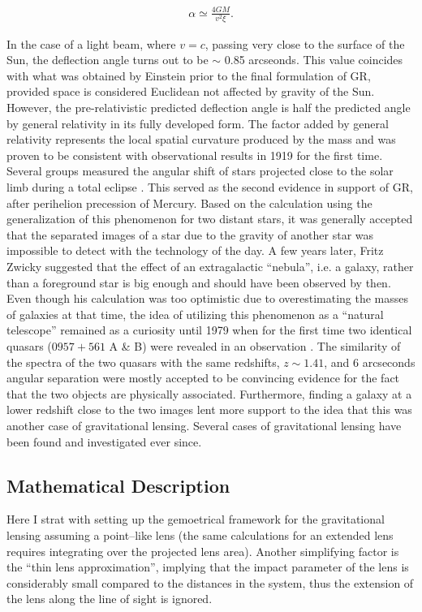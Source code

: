 \documentclass[paper=a4, fontsize=11pt]{scrartcl} %
\numberwithin{equation}{section} %
\numberwithin{figure}{section} %
\numberwithin{table}{section} %
\begin{document}
\begin{eqnarray}
\label{eq:alpha}
\alpha \simeq \frac{4GM}{v^2 \xi}.
\end{eqnarray}

In the case of a light beam, where $v = c$, passing very close to the surface of the Sun, the deflection angle turns out to be $\sim$ 0.85 arcseonds. This value coincides with what was obtained by Einstein prior to the final formulation of GR, provided space is considered Euclidean not affected by gravity of the Sun. However, the pre-relativistic predicted deflection angle is half the predicted angle by general relativity in its fully developed form. The factor added by general relativity represents the local spatial curvature produced by the mass and was proven to be consistent with observational results in 1919 for the first time. Several groups measured the angular shift of stars projected close to the solar limb during a total eclipse \citet{Eddington+1919}. This served as the second evidence in support of GR, after perihelion precession of Mercury. Based on the calculation using the generalization of this phenomenon for two distant stars, it was generally accepted that the separated images of a star due to the gravity of another star was impossible to detect with the technology of the day. A few years later, Fritz Zwicky suggested  \citep{Zwicky1937} that the effect of an extragalactic ``nebula'', i.e. a galaxy, rather than a foreground star is big enough and should have been observed by then. Even though his calculation was too optimistic due to overestimating the masses of galaxies at that time, the idea of utilizing this phenomenon as a ``natural telescope''  remained as a curiosity until 1979 when for the first time two identical quasars ($0957+561$ A \& B) were revealed in an observation \citep{Walsh+1979}. The similarity of the spectra of the two quasars with the same redshifts, $z \sim 1.41$, and 6 arcseconds angular separation were mostly accepted to be convincing evidence for the fact that the two objects are physically associated. Furthermore, finding a galaxy at a lower redshift close to the two images lent more support to the idea that this was another case of gravitational lensing. Several cases of gravitational lensing have been found and investigated ever since.

\subsection{Mathematical Description}
Here I strat with setting up the gemoetrical framework for the gravitational lensing assuming a point--like lens (the same calculations for an extended lens requires integrating over the projected lens area). Another simplifying factor is the ``thin lens approximation'', implying that the impact parameter of the lens is considerably small compared to the distances in the system, thus the extension of the lens along the line of sight is ignored.
\end{document}
